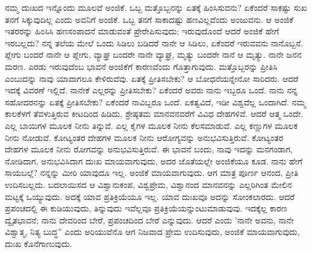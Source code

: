 ನಮ್ಮ ದುಃಖದ ಇನ್ನೊಂದು ಮೂಲವೆ ಅಂಜಿಕೆ. ಒಬ್ಬ ಮತ್ತೊಬ್ಬನನ್ನು ಏತಕ್ಕೆ ಹಿಂಸಿಸುವನು? ಏಕೆಂದರೆ ಸಾಕಷ್ಟು ಸುಖ ತನಗೆ ಸಿಕ್ಕುವುದಿಲ್ಲ ಎಂದು ಅವನಿಗೆ ಅಂಜಿಕೆ. ಒಬ್ಬ ತನಗೆ ಸಾಕಾದಷ್ಟು ಹಣವಿಲ್ಲವೆಂದು ಅಂಜುವನು. ಆ ಅಂಜಿಕೆ ಇತರರನ್ನು ಹಿಂಸಿಸಿ ಹಣಸಂಪಾದನೆ ಮಾಡುವಂತೆ ಪ್ರೇರೇಪಿಸುವುದು; ಇರುವುದೊಂದೆ ಆದರೆ ಅಂಜಿಕೆ ಹೇಗೆ ಇರಬಲ್ಲದು? ನನ್ನ ತಲೆಯ ಮೇಲೆ ಒಂದು ಸಿಡಿಲು ಬಡಿದರೆ ನಾನೇ ಆ ಸಿಡಿಲು, ಏಕೆಂದರೆ ಇರುವವನು ನಾನೊಬ್ಬನೆ. ಪ್ಲೇಗು ಬಂದರೆ ನಾನೇ ಆ ಪ್ಲೇಗು, ವ್ಯಾಘ್ರ ಬಂದರೇ ನಾನೇ ವ್ಯಾಘ್ರ, ಮೃತ್ಯು ಬಂದರೇ ನಾನೆ ಆ ಮೃತ್ಯು. ನಾನೇ ಜನನ ಮರಣ. ಎರಡು ಇರುವುದೆಂಬ ಭಾವನೆ ಅಂಜಿಕೆಗೆ ಕಾರಣವೆಂದು ಗೊತ್ತಾಗುವುದು. ಮತ್ತೊಬ್ಬರನ್ನು ಪ್ರೀತಿಸಿ ಎಂಬುದನ್ನು ನಾವು ಯಾವಾಗಲೂ ಕೇಳಿರುವೆವು. ಏತಕ್ಕೆ ಪ್ರೀತಿಸಬೇಕು? ಆ ಬೋಧನೆಯನ್ನೇನೋ ಸಾರಿದರು. ಆದರೆ ಇದಕ್ಕೆ ವಿವರಣೆ ಇಲ್ಲಿದೆ. ನಾನೇಕೆ ಎಲ್ಲರನ್ನು ಪ್ರೀತಿಸಬೇಕು? ಏಕೆಂದರೆ ಅವರು ನಾನು ಇಬ್ಬರೂ ಒಂದೆ. ನಾನು ನನ್ನ ಸಹೋದರನನ್ನು ಏತಕ್ಕೆ ಪ್ರೀತಿಸಬೇಕು? ಏಕೆಂದರೆ ನಾವಿಬ್ಬರೂ ಒಂದೆ. ಏಕತ್ವವಿದೆ, ಇಡೀ ವಿಶ್ವವೆಲ್ಲ ಒಂದಾಗಿದೆ. ನಮ್ಮ ಕಾಲಕೆಳಗೆ ತೆವಳುತ್ತಿರುವ ಕೀಟದಿಂದ ಹಿಡಿದು, ಶ್ರೇಷ್ಠತಮ ಮಾನವನವರೆಗೆ ವಿವಿಧ ದೇಹಗಳಿವೆ. ಆದರೆ ಆತ್ಮ ಒಂದೇ. ಎಲ್ಲ ಬಾಯಿಗಳ ಮೂಲಕ ನೀನು ತಿನ್ನುವೆ. ಎಲ್ಲ ಕೈಗಳ ಮೂಲಕ ನೀನು ಕೆಲಸಮಾಡುವೆ. ಎಲ್ಲ ಕಣ್ಣುಗಳ ಮೂಲಕ ನೀನು ನೋಡುವೆ. ಕೋಟ್ಯಂತರ ದೇಹಗಳ ಮೂಲಕ ನೀನು ಆರೋಗ್ಯವನ್ನು ಅನುಭವಿಸುತ್ತಿರುವೆ. ಕೋಟ್ಯಂತರ ದೇಹಗಳ ಮೂಲಕ ನೀನು ರೋಗವನ್ನು ಅನುಭವಿಸುತ್ತಿರುವೆ. ಈ ಭಾವನೆ ಬಂದು, ನಾವು ಇದನ್ನು ಮನಗಂಡಾಗ, ನೋಡಿದಾಗ, ಅನುಭವಿಸಿದಾಗ ದುಃಖ ಮಾಯವಾಗುವುದು, ಅದರ ಜೊತೆಯಲ್ಲೇ ಅಂಜಿಕೆಯೂ ಕೂಡ. ನಾನು ಹೇಗೆ ಸಾಯಬಲ್ಲೆ? ನನ್ನನ್ನು ಮೀರಿ ಯಾವುದೂ ಇಲ್ಲ. ಅಂಜಿಕೆ ಮಾಯವಾಗುವುದು. ಆಗ ಮಾತ್ರ ಪೂರ್ಣ ಆನಂದ, ಪ್ರೀತಿ ಉದಿಸಬಲ್ಲದು. ಬದಲಾಯಿಸದ ಆ ವಿಶ್ವಾನುಕಂಪ, ವಿಶ್ವಪ್ರೇಮ, ವಿಶ್ವಾನಂದ ಮಾನವನನ್ನು ಎಲ್ಲರಿಗಿಂತ ಮೇಲಿನ ಮಟ್ಟಕ್ಕೆ ಒಯ್ಯುವುದು. ಅದಕ್ಕೆ ಯಾವ ಪ್ರತಿಕ್ರಿಯೆಯೂ ಇಲ್ಲ. ಯಾವ ದುಃಖವೂ ಅದನ್ನು ಸೋಂಕಲಾರದು. ಆದರೆ ಪ್ರಪಂಚದಲ್ಲಿ ಈ ಕುಡಿಯುವುದು, ತಿನ್ನುವುದು ಇವೆಲ್ಲವೂ ಪ್ರತಿಕ್ರಿಯೆಯನ್ನುಂಟುಮಾಡುವುವು. ಇದಕ್ಕೆಲ್ಲ ಕಾರಣ ದ್ವೈತಭಾವನೆ; ನಾನು ದೇವರಿಂದ ಬೇರೆ, ಪ್ರಪಂಚದಿಂದ ಬೇರೆ ಎನ್ನುವುದು. ಆದರೆ ಎಂದು 'ನಾನೇ ಅವನು, ನಾನೇ ವಿಶ್ವಾತ್ಮ, ನಿತ್ಯ ಬುದ್ಧ” ಎಂದು ಅರಿಯುವೆನೊ ಆಗ ನಿಜವಾದ ಪ್ರೇಮ ಉದಿಸುವುದು, ಅಂಜಿಕೆ ಮಾಯವಾಗುವುದು, ದುಃಖ ಕೊನೆಗಾಣುವುದು.

